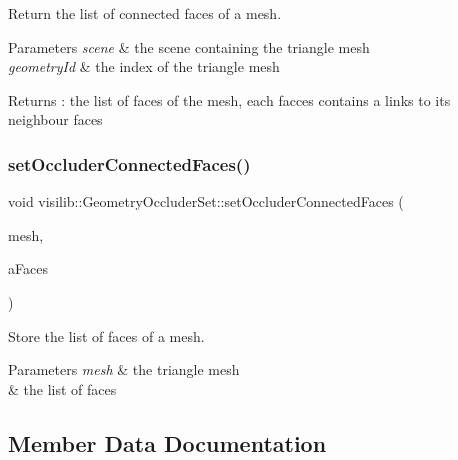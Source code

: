 Return the list of connected faces of a mesh. 


\begin{DoxyParams}{Parameters}
{\em scene} & the scene containing the triangle mesh \\
\hline
{\em geometry\+Id} & the index of the triangle mesh \\
\hline
\end{DoxyParams}
\begin{DoxyReturn}{Returns}
\+: the list of faces of the mesh, each facces contains a links to its neighbour faces 
\end{DoxyReturn}
\mbox{\label{classvisilib_1_1_geometry_occluder_set_a64be17502b1343e735a4385edeaf223f}} 
\subsubsection{\texorpdfstring{setOccluderConnectedFaces()}{setOccluderConnectedFaces()}}
{\footnotesize\ttfamily void visilib\+::\+Geometry\+Occluder\+Set\+::set\+Occluder\+Connected\+Faces (\begin{DoxyParamCaption}\item[{\mbox{\hyperlink{structvisilib_1_1_geometry_discrete_mesh_description}{Geometry\+Discrete\+Mesh\+Description}} $\ast$}]{mesh,  }\item[{std\+::vector$<$ \mbox{\hyperlink{classvisilib_1_1_silhouette_mesh_face}{Silhouette\+Mesh\+Face}} $>$ \&}]{a\+Faces }\end{DoxyParamCaption})\hspace{0.3cm}{\ttfamily [inline]}}



Store the list of faces of a mesh. 


\begin{DoxyParams}{Parameters}
{\em mesh} & the triangle mesh \\
\hline
{\em } & the list of faces \\
\hline
\end{DoxyParams}


\subsection{Member Data Documentation}
\mbox{\label{classvisilib_1_1_geometry_occluder_set_a96611893ad5c36867c415cf68cd320c4}} 
